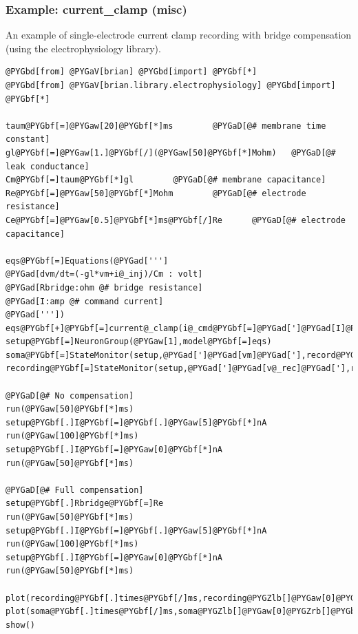 \documentclass[letterpaper,10pt,english]{manual}
\begin{document}
\resetcurrentobjects
\hypertarget{--doc-examples-misc_current_clamp}{}

\hypertarget{index-62}{}\subsubsection{Example: current\_clamp (misc)}

An example of single-electrode current clamp recording
with bridge compensation (using the electrophysiology library).

\begin{Verbatim}[commandchars=@\[\]]
@PYGbd[from] @PYGaV[brian] @PYGbd[import] @PYGbf[*]
@PYGbd[from] @PYGaV[brian.library.electrophysiology] @PYGbd[import] @PYGbf[*]

taum@PYGbf[=]@PYGaw[20]@PYGbf[*]ms        @PYGaD[@# membrane time constant]
gl@PYGbf[=]@PYGaw[1.]@PYGbf[/](@PYGaw[50]@PYGbf[*]Mohm)   @PYGaD[@# leak conductance]
Cm@PYGbf[=]taum@PYGbf[*]gl        @PYGaD[@# membrane capacitance]
Re@PYGbf[=]@PYGaw[50]@PYGbf[*]Mohm        @PYGaD[@# electrode resistance]
Ce@PYGbf[=]@PYGaw[0.5]@PYGbf[*]ms@PYGbf[/]Re      @PYGaD[@# electrode capacitance]

eqs@PYGbf[=]Equations(@PYGad[''']
@PYGad[dvm/dt=(-gl*vm+i@_inj)/Cm : volt]
@PYGad[Rbridge:ohm @# bridge resistance]
@PYGad[I:amp @# command current]
@PYGad['''])
eqs@PYGbf[+]@PYGbf[=]current@_clamp(i@_cmd@PYGbf[=]@PYGad[']@PYGad[I]@PYGad['],Re@PYGbf[=]Re,Ce@PYGbf[=]Ce,bridge@PYGbf[=]@PYGad[']@PYGad[Rbridge]@PYGad['])
setup@PYGbf[=]NeuronGroup(@PYGaw[1],model@PYGbf[=]eqs)
soma@PYGbf[=]StateMonitor(setup,@PYGad[']@PYGad[vm]@PYGad['],record@PYGbf[=]@PYGaA[True])
recording@PYGbf[=]StateMonitor(setup,@PYGad[']@PYGad[v@_rec]@PYGad['],record@PYGbf[=]@PYGaA[True])

@PYGaD[@# No compensation]
run(@PYGaw[50]@PYGbf[*]ms)
setup@PYGbf[.]I@PYGbf[=]@PYGbf[.]@PYGaw[5]@PYGbf[*]nA
run(@PYGaw[100]@PYGbf[*]ms)
setup@PYGbf[.]I@PYGbf[=]@PYGaw[0]@PYGbf[*]nA
run(@PYGaw[50]@PYGbf[*]ms)

@PYGaD[@# Full compensation]
setup@PYGbf[.]Rbridge@PYGbf[=]Re
run(@PYGaw[50]@PYGbf[*]ms)
setup@PYGbf[.]I@PYGbf[=]@PYGbf[.]@PYGaw[5]@PYGbf[*]nA
run(@PYGaw[100]@PYGbf[*]ms)
setup@PYGbf[.]I@PYGbf[=]@PYGaw[0]@PYGbf[*]nA
run(@PYGaw[50]@PYGbf[*]ms)

plot(recording@PYGbf[.]times@PYGbf[/]ms,recording@PYGZlb[]@PYGaw[0]@PYGZrb[]@PYGbf[/]mV,@PYGad[']@PYGad[b]@PYGad['])
plot(soma@PYGbf[.]times@PYGbf[/]ms,soma@PYGZlb[]@PYGaw[0]@PYGZrb[]@PYGbf[/]mV,@PYGad[']@PYGad[r]@PYGad['])
show()
\end{Verbatim}
\end{document}
